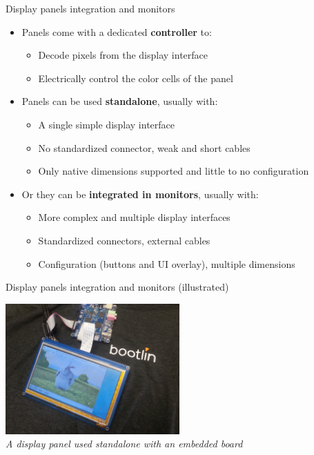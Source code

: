 \begin{frame}{Display panels integration and monitors}
  \begin{itemize}
  \item Panels come with a dedicated \textbf{controller} to:
    \begin{itemize}
    \item Decode pixels from the display interface
    \item Electrically control the color cells of the panel
    \end{itemize}
  \item Panels can be used \textbf{standalone}, usually with:
    \begin{itemize}
    \item A single simple display interface
    \item No standardized connector, weak and short cables
    \item Only native dimensions supported and little to no configuration
    \end{itemize}
  \item Or they can be \textbf{integrated in monitors}, usually with:
    \begin{itemize}
    \item More complex and multiple display interfaces
    \item Standardized connectors, external cables
    \item Configuration (buttons and UI overlay), multiple dimensions
    \end{itemize}
  \end{itemize}
\end{frame}

\begin{frame}{Display panels integration and monitors (illustrated)}
  \begin{center}
  \includegraphics[width=0.5\textwidth]{slides/graphics-hardware/display-panel.jpg}\\
  \textit{\small A display panel used standalone with an embedded board}
  \end{center}
\end{frame}

